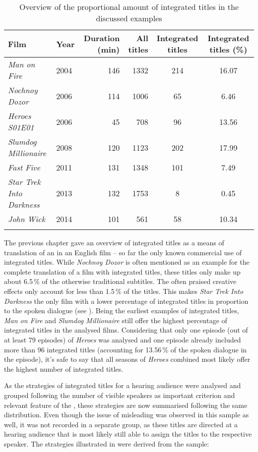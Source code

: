 \begin{table}[b]
\begin{tabularx}{\textwidth}{QlrrSS}
\lsptoprule
  Film &  Year & {Duration} (min) &  All titles &  Integrated titles & {Integrated titles} \bfseries (\%)\\
 \midrule
 \itshape Man on Fire & 2004 & 146 & 1332 & 214 & 16.07\\
 \tablevspace
 \itshape Nochnoy Dozor & 2006 & 114 & 1006 & 65 & 6.46\\
 \tablevspace
 \itshape Heroes S01E01 & 2006 & 45 & 708 & 96 & 13.56\\
 \tablevspace
 \itshape Slumdog Millionaire & 2008 & 120 & 1123 & 202 & 17.99\\
 \tablevspace
 \itshape Fast Five & 2011 & 131 & 1348 & 101 & 7.49\\
 \itshape Star Trek Into Darkness & 2013 & 132 & 1753 & 8 & 0.45\\
 \tablevspace
 \itshape John Wick & 2014 & 101 & 561 & 58 & 10.34\\
\lspbottomrule
\end{tabularx}
\caption{Overview of the proportional amount of integrated titles in the discussed examples}
\label{tab:TAB10}
\end{table}

The previous chapter gave an overview of integrated titles as a means of translation of an  in an English film – so far the only known commercial use of integrated titles. While \textit{Nochnoy Dozor} is often mentioned as an example for the complete translation of a film with integrated titles, these titles only make up about 6.5\,\% of the otherwise traditional subtitles. The often praised creative effects only account for less than 1.5\,\% of the titles. This makes \textit{Star Trek Into Darkness} the only film with a lower percentage of integrated titles in proportion to the spoken dialogue (see ). Being the earliest examples of integrated titles, \textit{Man on Fire} and \textit{Slumdog Millionaire} still offer the highest percentage of integrated titles in the analysed films. Considering that only one episode (out of at least 79 episodes) of \textit{Heroes} was analysed and one episode already included more than 96 integrated titles (accounting for 13.56\,\% of the spoken dialogue in the episode), it’s safe to say that all seasons of \textit{Heroes} combined most likely offer the highest number of integrated titles.

As the  strategies of integrated titles for a hearing audience were analysed and grouped following the number of visible speakers as important criterion and relevant feature of the , these strategies are now summarised following the same distribution. Even though the issue of misleading  was observed in this sample as well, it was not recorded in a separate group, as these titles are directed at a hearing audience that is most likely still able to assign the titles to the respective speaker. The strategies illustrated in  were derived from the sample:

